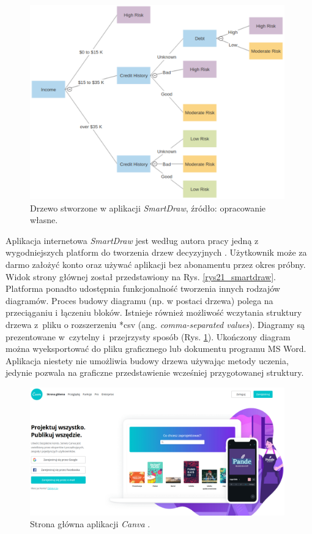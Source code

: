 \begin{figure}[htb]
	\centering
	\includegraphics[width=11cm]{grafika/smartdraw_tree.eps}
	\caption{Drzewo stworzone w aplikacji \textit{SmartDraw}, źródło: opracowanie własne.}
	\label{rys22_smartdraw_tree}
\end{figure}


Aplikacja internetowa \textit{SmartDraw} jest według autora pracy jedną z wygodniejszych platform do tworzenia drzew decyzyjnych \cite{misc_smartdraw}. Użytkownik może za darmo założyć konto oraz używać aplikacji bez abonamentu przez okres próbny. Widok strony głównej został przedstawiony na Rys. \ref{rys21_smartdraw}. Platforma ponadto udostępnia funkcjonalność tworzenia innych rodzajów diagramów. Proces budowy diagramu (np. w postaci drzewa) polega na przeciąganiu i łączeniu bloków. Istnieje również możliwość wczytania struktury drzewa z~pliku o rozszerzeniu *csv (ang. \textit{comma-separated values}). Diagramy są prezentowane w~czytelny i~przejrzysty sposób (Rys. \ref{rys22_smartdraw_tree}). Ukończony diagram można wyeksportować do pliku graficznego lub dokumentu programu MS Word. Aplikacja niestety nie umożliwia budowy drzewa używając metody uczenia, jedynie pozwala na graficzne przedstawienie wcześniej przygotowanej struktury.

\begin{figure}[htb]
	\centering
	\includegraphics[width=11cm]{grafika/canva.eps}
	\caption{Strona główna aplikacji \textit{Canva} \cite{misc_canva}.}
	\label{rys23_canva}
\end{figure}

